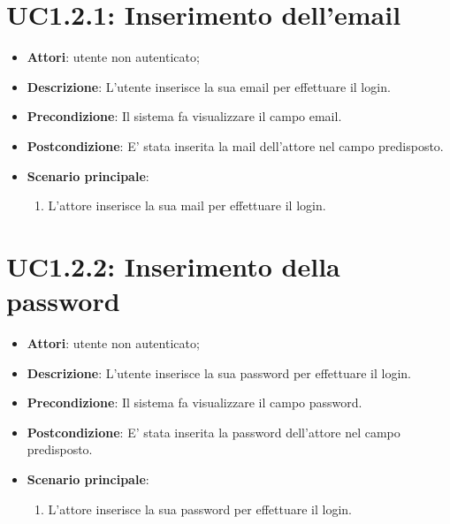 \section{UC1.2.1: Inserimento dell'email}
\label{UC1.2.1}
\begin{itemize}
	\item \textbf{Attori}: utente non autenticato;
	\item \textbf{Descrizione}: L'utente inserisce la sua email per effettuare il login.
	\item \textbf{Precondizione}: Il sistema fa visualizzare il campo email.
	\item \textbf{Postcondizione}: E' stata inserita la mail dell'attore nel campo predisposto.
	\item \textbf{Scenario principale}:
	\begin{enumerate} \item L'attore inserisce la sua mail per effettuare il login.\end{enumerate}
\end{itemize}

\section{UC1.2.2: Inserimento della password}
\label{UC1.2.2}
\begin{itemize}
	\item \textbf{Attori}: utente non autenticato;
	\item \textbf{Descrizione}: L'utente inserisce la sua password per effettuare il login.
	\item \textbf{Precondizione}: Il sistema fa visualizzare il campo password.
	\item \textbf{Postcondizione}: E' stata inserita la password dell'attore nel campo predisposto.
	\item \textbf{Scenario principale}:
	\begin{enumerate} \item L'attore inserisce la sua password per effettuare il login.\end{enumerate}
\end{itemize}

